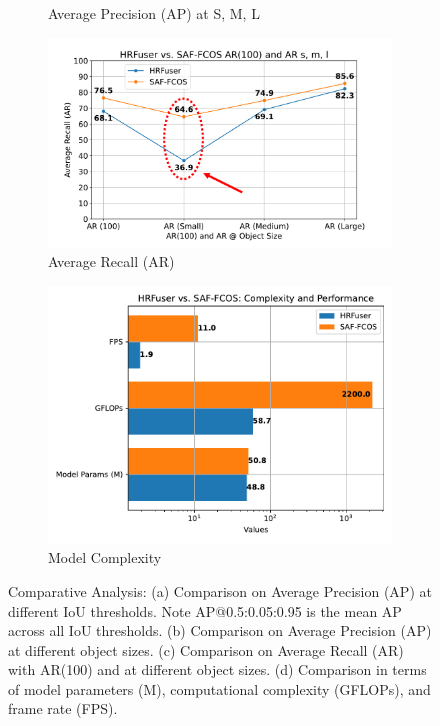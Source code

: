 \documentclass[report.tex]{subfiles}
\begin{document}
\begin{figure}[h!]
\begin{subfigure}[b]{0.45\textwidth}
            \caption{Average Precision (AP) at S, M, L}
            \label{fig:saf_vs_hrfuser_ap_sml}
        \end{subfigure}
        \vspace{1em} %
        \begin{subfigure}[b]{0.45\textwidth}
            \centering
            \includegraphics[width=\textwidth]{images/results/saf_vs_hrfuser/ar_anno.pdf}
            \caption{Average Recall (AR)}
            \label{fig:saf_vs_hrfuser_ar}
        \end{subfigure}
        \hfill
        \begin{subfigure}[b]{0.45\textwidth}
            \centering
            \includegraphics[width=\textwidth]{images/results/saf_vs_hrfuser/model_complexity.pdf}
            \caption{Model Complexity}
            \label{fig:saf_vs_hrfuser_model_complexity}
        \end{subfigure}
        \caption{Comparative Analysis: (a) Comparison on Average Precision (AP) at different IoU thresholds. Note AP@0.5:0.05:0.95 is the mean AP across all IoU thresholds. (b) Comparison on Average Precision (AP) at different object sizes. (c) Comparison on Average Recall (AR) with AR(100) and at different object sizes. (d) Comparison in terms of model parameters (M), computational complexity (GFLOPs), and frame rate (FPS).}
        \label{fig:comparative_analysis}
    \end{figure}
\end{document}
